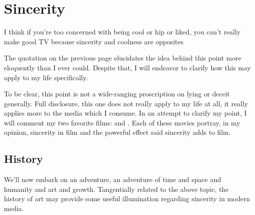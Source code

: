 \documentclass[../butidigress.tex]{subfiles}
\begin{document}
\chapter{Sincerity}\label{chap:sincerity}
\epigraph{I think if you're too concerned with being cool or hip or liked, you can't really make good TV because sincerity and coolness are opposites}{}
\newpage

The quotation on the previous page elucidates the idea behind this point more eloquently than I ever could.
Despite that, I will endeavor to clarify how this may apply to my life specifically.

To be clear, this point is not a wide-ranging proscription on lying or deceit generally.
Full disclosure, this one does not really apply to my life at all, it really applies more to the media which I consume.
In an attempt to clarify my point, I will comment my two favorite films:  and .
Each of these movies portray, in my opinion, sincerity in film and the powerful effect said sincerity adds to film.

\vspace{1em}

\section{History} 
We'll now embark on an adventure, an adventure of time and space and humanity and art and growth.
Tangentially related to the above topic, the history of art may provide some useful illumination regarding sincerity in modern media.
\end{document}
